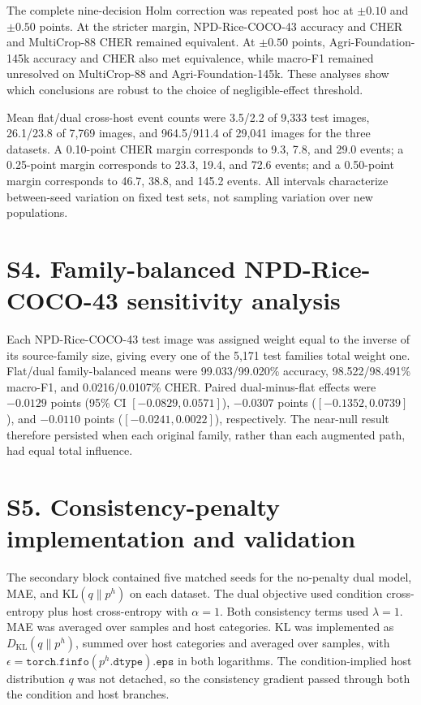 \documentclass[preprint,12pt]{elsarticle}
\begin{document}
The complete nine-decision Holm correction was repeated post hoc at
$\pm0.10$ and $\pm0.50$ points. At the stricter margin,
NPD-Rice-COCO-43 accuracy and CHER and MultiCrop-88 CHER remained
equivalent. At $\pm0.50$ points, Agri-Foundation-145k accuracy and CHER also
met equivalence, while macro-F1 remained unresolved on MultiCrop-88 and
Agri-Foundation-145k. These analyses show which conclusions are robust to the
choice of negligible-effect threshold.

Mean flat/dual cross-host event counts were 3.5/2.2 of 9,333 test images,
26.1/23.8 of 7,769 images, and 964.5/911.4 of 29,041 images for the three
datasets. A 0.10-point CHER margin corresponds to 9.3, 7.8, and 29.0 events; a
0.25-point margin corresponds to 23.3, 19.4, and 72.6 events; and a 0.50-point
margin corresponds to 46.7, 38.8, and 145.2 events. All intervals characterize
between-seed variation on fixed test sets, not sampling variation over new
populations.

\section*{S4. Family-balanced NPD-Rice-COCO-43 sensitivity analysis}

Each NPD-Rice-COCO-43 test image was assigned weight equal to the inverse of
its source-family size, giving every one of the 5,171 test families total weight
one. Flat/dual family-balanced means were 99.033/99.020\% accuracy,
98.522/98.491\% macro-F1, and 0.0216/0.0107\% CHER. Paired dual-minus-flat
effects were $-0.0129$ points (95\% CI $[-0.0829,0.0571]$), $-0.0307$ points
($[-0.1352,0.0739]$), and $-0.0110$ points ($[-0.0241,0.0022]$), respectively.
The near-null result therefore persisted when each original family, rather than
each augmented path, had equal total influence.

\section*{S5. Consistency-penalty implementation and validation}

The secondary block contained five matched seeds for the no-penalty dual model,
MAE, and $\mathrm{KL}(q\|p^h)$ on each dataset. The dual objective used
condition cross-entropy plus host cross-entropy with $\alpha=1$. Both
consistency terms used $\lambda=1$. MAE was averaged over samples and host
categories. KL was implemented as $D_{\mathrm{KL}}(q\|p^h)$, summed over host
categories and averaged over samples, with
$\epsilon=\texttt{torch.finfo}(p^h.\texttt{dtype}).\texttt{eps}$ in both
logarithms. The condition-implied host distribution $q$ was not detached, so
the consistency gradient passed through both the condition and host branches.
\end{document}
